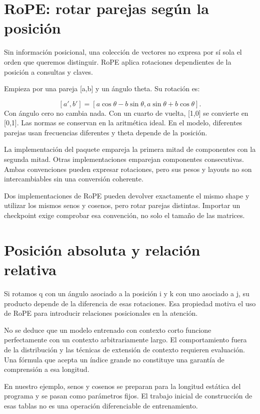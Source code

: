 \documentclass[12pt,a4paper,oneside]{report}
\begin{document}
\section{RoPE: rotar parejas según la posición}
Sin información posicional, una colección de vectores no expresa por sí sola el orden que queremos distinguir. RoPE aplica rotaciones dependientes de la posición a consultas y claves. \cite{rope}

Empieza por una pareja [a,b] y un ángulo theta. Su rotación es:

\[
[a',b']=[a\cos\theta-b\sin\theta,
          a\sin\theta+b\cos\theta].
\]
Con ángulo cero no cambia nada. Con un cuarto de vuelta, [1,0] se convierte en [0,1]. Las normas se conservan en la aritmética ideal. En el modelo, diferentes parejas usan frecuencias diferentes y theta depende de la posición.

La implementación del paquete empareja la primera mitad de componentes con la segunda mitad. Otras implementaciones emparejan componentes consecutivas. Ambas convenciones pueden expresar rotaciones, pero sus pesos y layouts no son intercambiables sin una conversión coherente.

\begin{cuidado}
Dos implementaciones de RoPE pueden devolver exactamente el mismo shape y utilizar los mismos senos y cosenos, pero rotar parejas distintas. Importar un checkpoint exige comprobar esa convención, no solo el tamaño de las matrices.

\end{cuidado}
\section{Posición absoluta y relación relativa}
Si rotamos q con un ángulo asociado a la posición i y k con uno asociado a j, su producto depende de la diferencia de esas rotaciones. Esa propiedad motiva el uso de RoPE para introducir relaciones posicionales en la atención.

No se deduce que un modelo entrenado con contexto corto funcione perfectamente con un contexto arbitrariamente largo. El comportamiento fuera de la distribución y las técnicas de extensión de contexto requieren evaluación. Una fórmula que acepta un índice grande no constituye una garantía de comprensión a esa longitud.

En nuestro ejemplo, senos y cosenos se preparan para la longitud estática del programa y se pasan como parámetros fijos. El trabajo inicial de construcción de esas tablas no es una operación diferenciable de entrenamiento.
\end{document}
